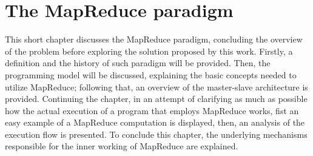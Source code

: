 \chapter{The MapReduce paradigm}
This short chapter discusses the MapReduce paradigm, concluding the overview of the problem before exploring the solution proposed by this work. Firstly, a definition and the history of such paradigm will be provided. Then, the programming model will be discussed, explaining the basic concepts needed to utilize MapReduce; following that, an overview of the master-slave architecture is provided. Continuing the chapter, in an attempt of clarifying as much as possible how the actual execution of a program that employs MapReduce works, fist an easy example of a MapReduce computation is displayed, then, an analysis of the execution flow is presented. To conclude this chapter, the underlying mechanisms responsible for the inner working of MapReduce are explained. 






